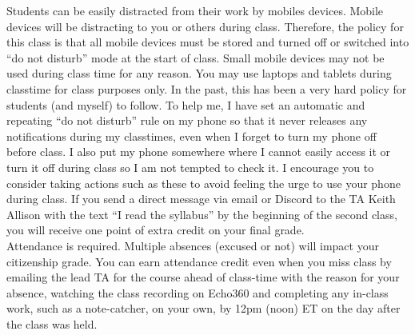 \documentclass[10pt]{article}
\begin{document}
Students can be easily distracted from their work by mobiles devices. Mobile devices will be distracting to you or others during class. Therefore, the policy for this class is that all mobile devices must be stored and turned off or switched into ``do not disturb'' mode at the start of class. Small mobile devices may not be used during class time for any reason. %
You may use laptops and tablets during classtime for class purposes only. In the past, this has been a very hard policy for students (and myself) to follow. To help me, I have set an automatic and repeating ``do not disturb'' rule on my phone so that it never releases any notifications during my classtimes, even when I forget to turn my phone off before class. I also put my phone somewhere where I cannot easily access it or turn it off during class so I am not tempted to check it. I encourage you to consider taking actions such as these to avoid feeling the urge to use your phone during class. %
If you send a direct message via email or Discord to the TA Keith Allison with the text ``I read the syllabus'' by the beginning of the second class, you will receive one point of extra credit on your final grade. \\


 Attendance is required. Multiple absences (excused or not) will impact your citizenship grade. You can earn attendance credit even when you miss class by emailing the lead TA for the course ahead of class-time with the reason for your absence, watching the class recording on Echo360 and completing any in-class work, such as a note-catcher, on your own, by 12pm (noon) ET on the day after the class was held. \\
\end{document}
